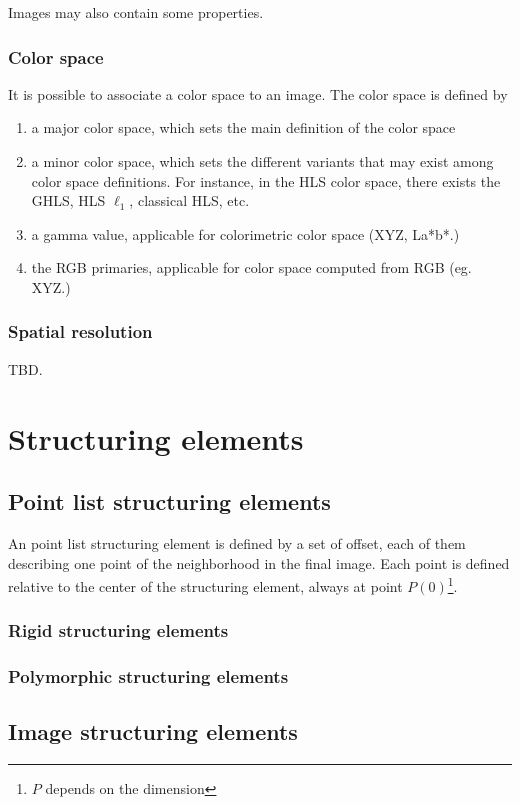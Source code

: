 Images may also contain some properties. 
\subsection{Color space}
It is possible to associate a color space to an image. The color space is defined by
\begin{enumerate}
\item a major color space, which sets the main definition of the color space
\item a minor color space, which sets the different variants that may exist among color space definitions. For instance, in the HLS color space, there exists the GHLS, HLS $\ell_1$, classical HLS, etc.
\item a gamma value, applicable for colorimetric color space (XYZ, La*b*.)
\item the RGB primaries, applicable for color space computed from RGB (eg. XYZ.)
\end{enumerate}

\subsection{Spatial resolution}
TBD.

\chapter{Structuring elements}
\label{chap:se}


\section{Point list structuring elements}
\label{sec:se:point_list}
An point list structuring element is defined by a set of offset, each of them describing one point of the neighborhood in the final image. Each point is defined relative to the center of the structuring element, always at point $P(0)$\footnote{$P$ depends on the dimension}.
 

\subsection{Rigid structuring elements}

\subsection{Polymorphic structuring elements}

\section{Image structuring elements}


